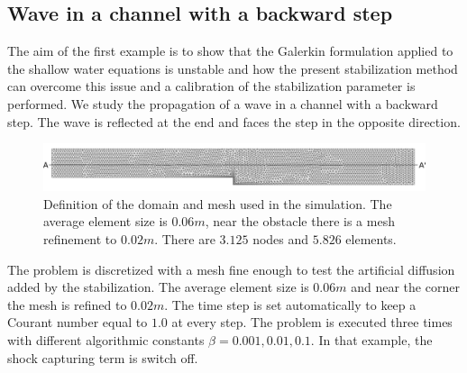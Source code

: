 \documentclass[a4paper,12pt]{article}
\begin{document}
\subsection{Wave in a channel with a backward step}

The aim of the first example is to show that the Galerkin formulation applied to the shallow water equations is unstable and how the present stabilization method can overcome this issue and a calibration of the stabilization parameter is performed.
We study the propagation of a wave in a channel with a backward step. The wave is reflected at the end and faces the step in the opposite direction. 

\begin{figure}
    \includegraphics[width=\textwidth]{img/step/mesh.pdf}
    \caption{Definition of the domain and mesh used in the simulation. The average element size is $0.06m$, near the obstacle there is a mesh refinement to $0.02m$. There are $3.125$ nodes and $5.826$ elements.}
    \label{step_mesh}
\end{figure}

The problem is discretized with a mesh fine enough to test the artificial diffusion added by the stabilization. The average element size is $0.06m$ and near the corner the mesh is refined to $0.02m$.
The time step is set automatically to keep a Courant number equal to $1.0$ at every step. The problem is executed three times with different algorithmic constants $\beta = 0.001, 0.01, 0.1$. In that example, the shock capturing term is switch off.
\end{document}
